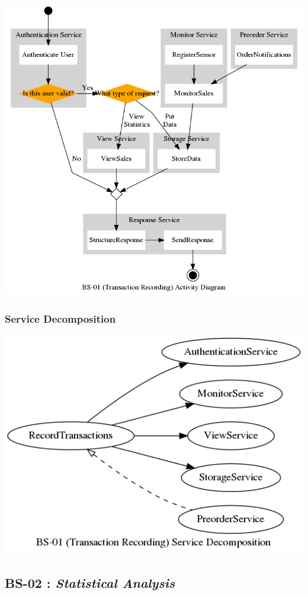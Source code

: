 \documentclass[11pt]{article}
\begin{document}
\begin{center}
\includegraphics[width=.9\linewidth]{res/bs_01_act.png}
\end{center}
\subsubsection{Service Decomposition}
\label{sec:org19580e4}
\begin{center}
\includegraphics[width=.9\linewidth]{res/bs_01_dcmp.png}
\end{center}
\newpage

\subsection{\label{org8341786}BS-02 : \emph{Statistical Analysis}}
\label{sec:orgc01cbf0}
\end{document}
